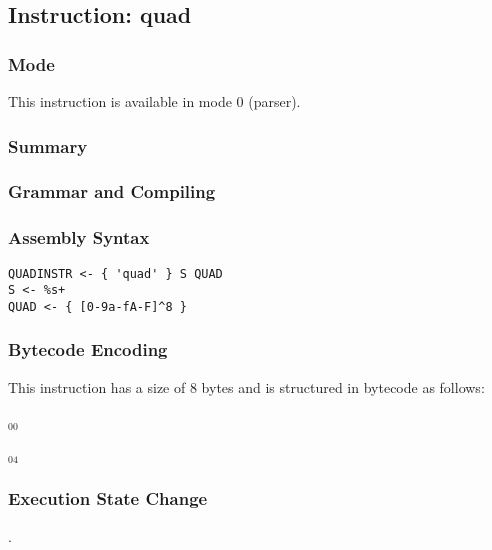 \subsection{Instruction: quad}

\subsubsection{Mode}
This instruction is available in mode 0 (parser).
\subsubsection{Summary}


\subsubsection{Grammar and Compiling}


\subsubsection{Assembly Syntax}

\begin{myquote}
\begin{verbatim}
QUADINSTR <- { 'quad' } S QUAD
S <- %s+
QUAD <- { [0-9a-fA-F]^8 }
\end{verbatim}
\end{myquote}

\subsubsection{Bytecode Encoding}

This instruction has a size of 8 bytes and is structured in bytecode as follows:

$_{00}$\ 



$_{04}$\ 


\subsubsection{Execution State Change}

.


